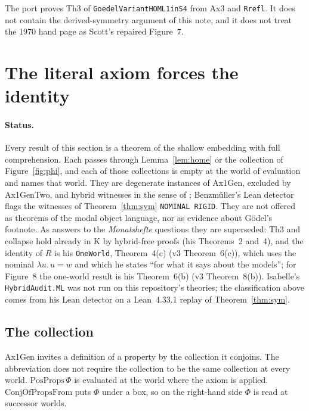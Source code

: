 \documentclass[11pt,a4paper]{article}
\newcommand{\lean}[1]{\texttt{#1}}
\theoremstyle{definition}
\theoremstyle{remark}
\begin{document}
The port proves Th3 of \lean{GoedelVariantHOML1inS4} from Ax3 and \lean{Rrefl}.
It does not contain the derived-symmetry argument of this note, and it does
not treat the 1970 hand page as Scott's repaired Figure~7.

\section{The literal axiom forces the identity}
\label{sec:literal}

\paragraph{Status.}
Every result of this section is a theorem of the shallow embedding with full
comprehension.
Each passes through Lemma~\ref{lem:home} or the collection of
Figure~\ref{fig:phi}, and each of those collections is empty at the world of
evaluation and names that world.
They are degenerate instances of Ax1Gen, excluded by Ax1GenTwo, and hybrid
witnesses in the sense of \cite{benzmuellerPWN2026}; Benzm\"uller's Lean
detector flags the witnesses of Theorem~\ref{thm:sym} \lean{NOMINAL RIGID}.
They are not offered as theorems of the modal object language, nor as
evidence about G\"odel's footnote.
As answers to the \emph{Monatshefte} questions they are superseded: Th3 and
collapse hold already in K by hybrid-free proofs (his Theorems~2 and~4), and
the identity of \(R\) is his \lean{OneWorld}, Theorem~4(c) (v3 Theorem~6(c)), which uses the
nominal \(\lambda u.\, u = w\) and which he states ``for what it says about
the models''; for Figure~8 the one-world result is his Theorem~6(b) (v3 Theorem~8(b)).
Isabelle's \lean{HybridAudit.ML} was not run on this repository's
theories; the classification above comes from his Lean detector on a
Lean~4.33.1 replay of Theorem~\ref{thm:sym}.

\subsection{The collection}
\label{sec:collection}

Ax1Gen invites a definition of a property by the collection it conjoins.
The abbreviation does not require the collection to be the same collection at
every world.
\(\mathrm{PosProps}\,\Phi\) is evaluated at the world where the axiom is
applied.
\(\mathrm{ConjOfPropsFrom}\) puts \(\Phi\) under a box, so on the right-hand
side \(\Phi\) is read at successor worlds.
\end{document}
